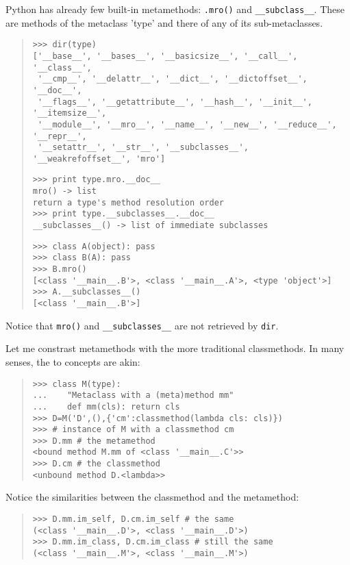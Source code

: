 \documentclass[10pt,english]{article}
\begin{document}
Python has already few built-in metamethods: \texttt{.mro()} 
and \texttt{{\_}{\_}subclass{\_}{\_}}. These are methods of the metaclass 'type' and
there of any of its sub-metaclasses.
\begin{quote}
\begin{verbatim}>>> dir(type)
['__base__', '__bases__', '__basicsize__', '__call__', '__class__', 
 '__cmp__', '__delattr__', '__dict__', '__dictoffset__', '__doc__', 
 '__flags__', '__getattribute__', '__hash__', '__init__', '__itemsize__', 
 '__module__', '__mro__', '__name__', '__new__', '__reduce__', '__repr__', 
 '__setattr__', '__str__', '__subclasses__', '__weakrefoffset__', 'mro']\end{verbatim}
\begin{verbatim}>>> print type.mro.__doc__
mro() -> list
return a type's method resolution order
>>> print type.__subclasses__.__doc__
__subclasses__() -> list of immediate subclasses\end{verbatim}
\begin{verbatim}>>> class A(object): pass
>>> class B(A): pass
>>> B.mro()
[<class '__main__.B'>, <class '__main__.A'>, <type 'object'>]
>>> A.__subclasses__()
[<class '__main__.B'>]\end{verbatim}
\end{quote}

Notice that \texttt{mro()} and \texttt{{\_}{\_}subclasses{\_}{\_}} are not retrieved by \texttt{dir}.

Let me constrast metamethods with the more traditional classmethods.
In many senses, the to concepts are akin:
\begin{quote}
\begin{verbatim}>>> class M(type): 
...    "Metaclass with a (meta)method mm"
...    def mm(cls): return cls
>>> D=M('D',(),{'cm':classmethod(lambda cls: cls)}) 
>>> # instance of M with a classmethod cm
>>> D.mm # the metamethod
<bound method M.mm of <class '__main__.C'>>
>>> D.cm # the classmethod
<unbound method D.<lambda>>\end{verbatim}
\end{quote}

Notice the similarities between the classmethod and the metamethod:
\begin{quote}
\begin{verbatim}>>> D.mm.im_self, D.cm.im_self # the same
(<class '__main__.D'>, <class '__main__.D'>)
>>> D.mm.im_class, D.cm.im_class # still the same
(<class '__main__.M'>, <class '__main__.M'>)\end{verbatim}
\end{quote}
\end{document}
